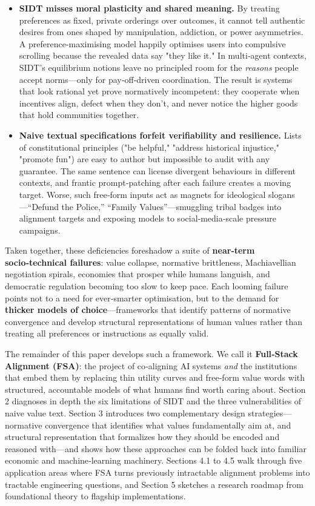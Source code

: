 \begin{itemize}
\item \textbf{SIDT misses moral plasticity and shared meaning.} By treating preferences as fixed, private orderings over outcomes, it cannot tell authentic desires from ones shaped by manipulation, addiction, or power asymmetries.  A preference‑maximising model happily optimises users into compulsive scrolling because the revealed data say "they like it."  In multi‑agent contexts, SIDT's equilibrium notions leave no principled room for the \textit{reasons} people accept norms—only for pay‑off‑driven coordination.  The result is systems that look rational yet prove normatively incompetent: they cooperate when incentives align, defect when they don't, and never notice the higher goods that hold communities together.

\item \textbf{Naive textual specifications forfeit verifiability and resilience.} Lists of constitutional principles ("be helpful," "address historical injustice," "promote fun") are easy to author but impossible to audit with any guarantee.  The same sentence can license divergent behaviours in different contexts, and frantic prompt‑patching after each failure creates a moving target.  Worse, such free‑form inputs act as magnets for ideological slogans—``Defund the Police,'' ``Family Values''—smuggling tribal badges into alignment targets and exposing models to social‑media‑scale pressure campaigns.
\end{itemize}

Taken together, these deficiencies foreshadow a suite of \textbf{near‑term socio‑technical failures}: value collapse, normative brittleness, Machiavellian negotiation spirals, economies that prosper while humans languish, and democratic regulation becoming too slow to keep pace.  Each looming failure points not to a need for ever‑smarter optimisation, but to the demand for \textbf{thicker models of choice}—frameworks that identify patterns of normative convergence and develop structural representations of human values rather than treating all preferences or instructions as equally valid.

The remainder of this paper develops such a framework.  We call it \textbf{Full‑Stack Alignment (FSA)}: the project of co‑aligning AI systems \textit{and} the institutions that embed them by replacing thin utility curves and free‑form value words with structured, accountable models of what humans find worth caring about.  Section 2 diagnoses in depth the six limitations of SIDT and the three vulnerabilities of naive value text. Section 3 introduces two complementary design strategies—normative convergence that identifies what values fundamentally aim at, and structural representation that formalizes how they should be encoded and reasoned with—and shows how these approaches can be folded back into familiar economic and machine‑learning machinery. Sections 4.1 to 4.5 walk through five application areas where FSA turns previously intractable alignment problems into tractable engineering questions, and Section 5 sketches a research roadmap from foundational theory to flagship implementations.

